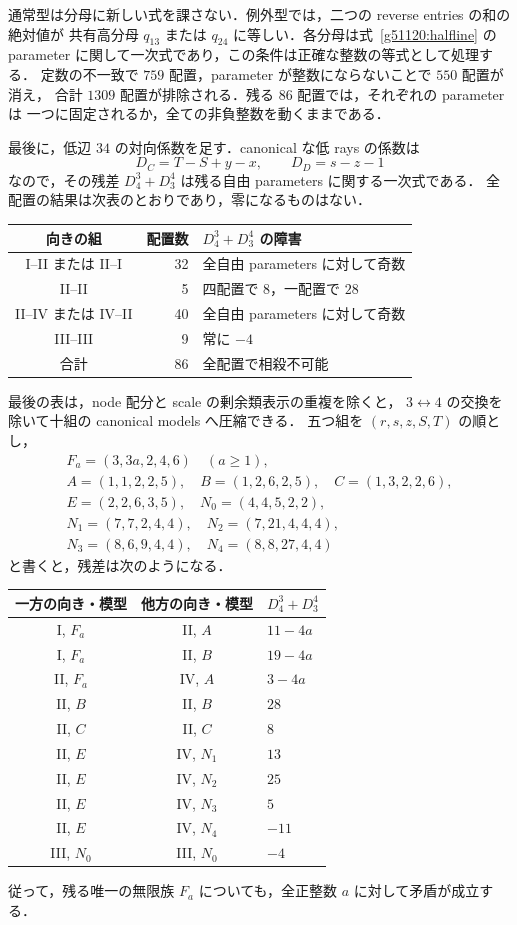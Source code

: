通常型は分母に新しい式を課さない．例外型では，二つの reverse entries の和の絶対値が
共有高分母 $q_{13}$ または $q_{24}$ に等しい．各分母は式~\eqref{g51120:halfline} の
parameter に関して一次式であり，この条件は正確な整数の等式として処理する．
定数の不一致で $759$ 配置，parameter が整数にならないことで $550$ 配置が消え，
合計 $1309$ 配置が排除される．残る $86$ 配置では，それぞれの parameter は
一つに固定されるか，全ての非負整数を動くままである．

最後に，低辺 $34$ の対向係数を足す．canonical な低 rays の係数は
\[
 D_C=T-S+y-x,\qquad D_D=s-z-1
\]
なので，その残差 $D^3_4+D^4_3$ は残る自由 parameters に関する一次式である．
全配置の結果は次表のとおりであり，零になるものはない．
\begin{center}\small
\begin{tabular}{crl}
向きの組&配置数&$D^3_4+D^4_3$ の障害\\\hline
I--II または II--I&32&全自由 parameters に対して奇数\\
II--II&5&四配置で $8$，一配置で $28$\\
II--IV または IV--II&40&全自由 parameters に対して奇数\\
III--III&9&常に $-4$\\\hline
合計&86&全配置で相殺不可能
\end{tabular}
\end{center}

最後の表は，node 配分と scale の剰余類表示の重複を除くと，
$3\leftrightarrow4$ の交換を除いて十組の canonical models へ圧縮できる．
五つ組を $(r,s,z,S,T)$ の順とし，
\[
 \begin{gathered}
 F_a=(3,3a,2,4,6)\quad(a\ge1),\\
 A=(1,1,2,2,5),\quad B=(1,2,6,2,5),\quad C=(1,3,2,2,6),\\
 E=(2,2,6,3,5),\quad N_0=(4,4,5,2,2),\\
 N_1=(7,7,2,4,4),\quad N_2=(7,21,4,4,4),\\
 N_3=(8,6,9,4,4),\quad N_4=(8,8,27,4,4)
 \end{gathered}
\]
と書くと，残差は次のようになる．
\begin{center}\small
\begin{tabular}{ccl}
一方の向き・模型&他方の向き・模型&$D^3_4+D^4_3$\\\hline
I, $F_a$&II, $A$&$11-4a$\\
I, $F_a$&II, $B$&$19-4a$\\
II, $F_a$&IV, $A$&$3-4a$\\
II, $B$&II, $B$&$28$\\
II, $C$&II, $C$&$8$\\
II, $E$&IV, $N_1$&$13$\\
II, $E$&IV, $N_2$&$25$\\
II, $E$&IV, $N_3$&$5$\\
II, $E$&IV, $N_4$&$-11$\\
III, $N_0$&III, $N_0$&$-4$
\end{tabular}
\end{center}
従って，残る唯一の無限族 $F_a$ についても，全正整数 $a$ に対して矛盾が成立する．

